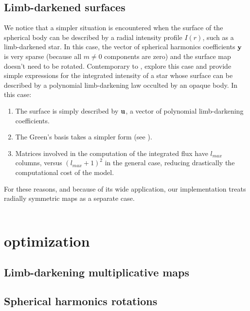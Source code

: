 \documentclass[modern]{aastex631}
\begin{document}
\subsection{Limb-darkened surfaces}
We notice that a simpler situation is encountered when the surface of the spherical body can be described by a radial intensity profile $I(r)$, such as a limb-darkened star. In this case, the vector of spherical harmonics coefficients ${\mathbf{y}}$ is very sparse (because all $m\neq0$ components are zero) and the surface map doesn't need to be rotated. Contemporary to \cite{starry}, \cite{Agol2020} explore this case and provide simple expressions for the integrated intensity of a star whose surface can be described by a polynomial limb-darkening law occulted by an opaque body. In this case:
\begin{enumerate}
    \item The surface is simply described by ${\mathbf{u}}$, a vector of polynomial limb-darkening coefficients.
    \item The Green's basis takes a simpler form (see \citealt[Eq. X]{Agol2020}).
    \item Matrices involved in the computation of the integrated flux have $l_{max}$ columns, versus $(l_{max}+1)^2$ in the general case, reducing drastically the computational cost of the model.
\end{enumerate}
For these reasons, and because of its wide application, our implementation treats radially symmetric maps as a separate case.\\\\



\section{optimization}\label{optimization}
\subsection{Limb-darkening multiplicative maps}
\subsection{Spherical harmonics rotations}

\end{document}
